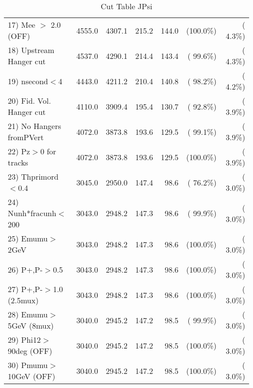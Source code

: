 \begin{table}[h!]
\begin{tabular}{||l||r|r|r|r|r|r||}
 17) Mee $>$ 2.0  (OFF)   &       4555.0 &       4307.1 &        215.2 &        144.0 & (100.0\%) & (  4.3\%) \\
 18) Upstream Hanger cut  &       4537.0 &       4290.1 &        214.4 &        143.4 & ( 99.6\%) & (  4.3\%) \\
 19) nsecond$<$4          &       4443.0 &       4211.2 &        210.4 &        140.8 & ( 98.2\%) & (  4.2\%) \\
 20) Fid. Vol. Hanger cut &       4110.0 &       3909.4 &        195.4 &        130.7 & ( 92.8\%) & (  3.9\%) \\
 21) No Hangers fromPVert &       4072.0 &       3873.8 &        193.6 &        129.5 & ( 99.1\%) & (  3.9\%) \\
 22) Pz$>$0 for tracks    &       4072.0 &       3873.8 &        193.6 &        129.5 & (100.0\%) & (  3.9\%) \\
 23) Thprimord$<$0.4      &       3045.0 &       2950.0 &        147.4 &         98.6 & ( 76.2\%) & (  3.0\%) \\
 24) Nunh*fracunh$<$200   &       3043.0 &       2948.2 &        147.3 &         98.6 & ( 99.9\%) & (  3.0\%) \\
 25) Emumu$>$2GeV         &       3043.0 &       2948.2 &        147.3 &         98.6 & (100.0\%) & (  3.0\%) \\
 26) P+,P-$>$0.5          &       3043.0 &       2948.2 &        147.3 &         98.6 & (100.0\%) & (  3.0\%) \\
 27) P+,P-$>$1.0 (2.5mux) &       3043.0 &       2948.2 &        147.3 &         98.6 & (100.0\%) & (  3.0\%) \\
 28) Emumu$>$5GeV  (8mux) &       3040.0 &       2945.2 &        147.2 &         98.5 & ( 99.9\%) & (  3.0\%) \\
 29) Phi12$>$90deg  (OFF) &       3040.0 &       2945.2 &        147.2 &         98.5 & (100.0\%) & (  3.0\%) \\
 30) Pmumu$>$10GeV  (OFF) &       3040.0 &       2945.2 &        147.2 &         98.5 & (100.0\%) & (  3.0\%) \\
 \hline
 \hline
 \end{tabular}
 \caption{Cut Table  JPsi     }
 \label{tab-cutcohjpsi-mumu_cohrhop}
 \end{table}
